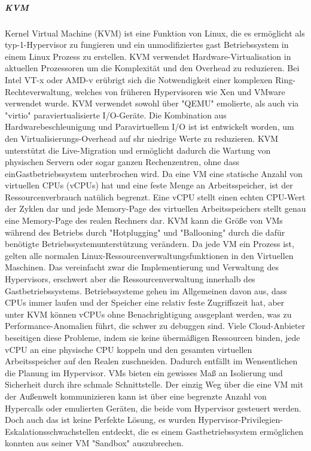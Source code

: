 \subparagraph{KVM}
Kernel Virtual Machine (KVM) ist eine Funktion von Linux, die es ermöglicht als typ-1-Hypervisor zu fungieren und ein unmodifiziertes gast Betriebssystem in einem Linux Prozess zu erstellen. KVM verwendet Hardware-Virtualisation in aktuellen Prozessoren um die Komplexität und den Overhead zu reduzieren. Bei Intel VT-x oder AMD-v erübrigt sich die Notwendigkeit einer komplexen Ring-Rechteverwaltung, welches von früheren Hypervisoren wie Xen und VMware verwendet wurde. KVM verwendet sowohl über "QEMU\cite{QEMUEmulator}" emolierte, als auch via "virtio\cite{View2018VirtioVirtio}" paraviertualisierte I/O-Geräte. Die Kombination aus Hardwarebeschleunigung und Paravirtuellem I/O ist ist entwickelt worden, um den Virtualisierungs-Overhead auf shr niedrige Werte zu reduzieren. KVM unterstützt die Live-Migration und ermöglicht dadurch die Wartung von physischen Servern oder sogar ganzen Rechenzentren, ohne dass einGastbetriebssystem unterbrochen wird. Da eine VM eine statische Anzahl von virtuellen CPUs (vCPUs) hat und eine feste Menge an Arbeitsspeicher, ist der Ressourcenverbrauch natülich begrenzt. Eine vCPU stellt einen echten CPU-Wert der Zyklen dar und jede Memory-Page des virtuellen Arbeitsspeichers stellt genau eine Memory-Page des realen Rechners dar. KVM kann die Größe von VMs während des Betriebs durch "Hotplugging" und "Ballooning" durch die dafür benötigte Betriebssystemunterstützung verändern. Da jede VM ein Prozess ist, gelten alle normalen Linux-Ressourcenverwaltungsfunktionen in den Virtuellen Maschinen. Das vereinfacht zwar die Implementierung und Verwaltung des Hypervisors, erschwert aber die Ressourcenverwaltung innerhalb des Gastbetriebssystems. Betriebssysteme gehen im Allgemeinen davon aus, dass CPUs immer laufen und der Speicher eine relativ feste Zugriffszeit hat, aber unter KVM können vCPUs ohne Benachrightigung ausgeplant werden, was zu Performance-Anomalien führt, die schwer zu debuggen sind. Viele Cloud-Anbieter beseitigen diese Probleme, indem sie keine übermäßigen Ressourcen binden, jede vCPU an eine physische CPU koppeln und den gesamten virtuellen Arbeitsspeicher auf den Realen zuschneiden. Dadurch entfällt im Wensentlichen die Planung im Hypervisor. VMs bieten ein gewisses Maß an Isolierung und Sicherheit durch ihre schmale Schnittstelle. Der einzig Weg über die eine VM mit der Außenwelt kommunizieren kann ist über eine begrenzte Anzahl von Hypercalls oder emulierten Geräten, die beide vom Hypervisor gesteuert werden. Doch auch das ist keine Perfekte Lösung, es wurden Hypervisor-Privilegien-Eskalationsschwachstellen entdeckt, die es einem Gastbetriebssystem ermöglichen konnten aus seiner VM "Sandbox" auszubrechen\cite{Felter2014IBMContainers}.

